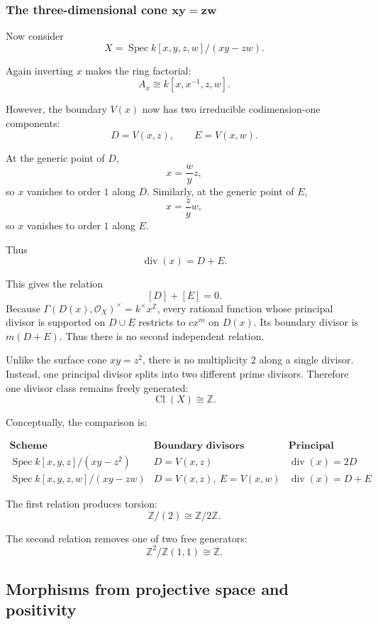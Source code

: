 \subsubsection{The three-dimensional cone \(\boldsymbol{xy=zw}\)}

Now consider
\[
X=\operatorname{Spec} k[x,y,z,w]/(xy-zw).
\]

Again inverting \(x\) makes the ring factorial:
\[
A_x\cong k[x,x^{-1},z,w].
\]

However, the boundary \(V(x)\) now has two irreducible codimension-one components:
\[
D=V(x,z),
\qquad
E=V(x,w).
\]

At the generic point of \(D\),
\[
x=\frac{w}{y}z,
\]
so \(x\) vanishes to order \(1\) along \(D\). Similarly, at the generic point of \(E\),
\[
x=\frac{z}{y}w,
\]
so \(x\) vanishes to order \(1\) along \(E\).

Thus
\[
\operatorname{div}(x)=D+E.
\]

This gives the relation
\[
[D]+[E]=0.
\]
Because \(\Gamma(D(x),\mathcal O_X)^\times
=k^\times x^{\mathbb Z}\), every rational function whose
principal divisor is supported on \(D\cup E\) restricts to
\(c x^m\) on \(D(x)\). Its boundary divisor is
\(m(D+E)\). Thus there is no second independent relation.

Unlike the surface cone \(xy=z^2\), there is no multiplicity \(2\) along a single divisor. Instead, one principal divisor splits into two different prime divisors. Therefore one divisor class remains freely generated:
\[
\operatorname{Cl}(X)\cong \mathbb{Z}.
\]

Conceptually, the comparison is:

\[
\begin{array}{c|c|c}
	\textbf{Scheme} & \textbf{Boundary divisors} & \textbf{Principal relation} \\
	\hline
	\operatorname{Spec} k[x,y,z]/(xy-z^2)
	&
	D=V(x,z)
	&
	\operatorname{div}(x)=2D
	\\[4pt]
	\operatorname{Spec} k[x,y,z,w]/(xy-zw)
	&
	D=V(x,z),\ E=V(x,w)
	&
	\operatorname{div}(x)=D+E
\end{array}
\]

The first relation produces torsion:
\[
\mathbb{Z}/(2)\cong \mathbb{Z}/2\mathbb{Z}.
\]

The second relation removes one of two free generators:
\[
\mathbb{Z}^2/\mathbb{Z}(1,1)\cong \mathbb{Z}.
\]

\subsection{Morphisms from projective space and positivity}

